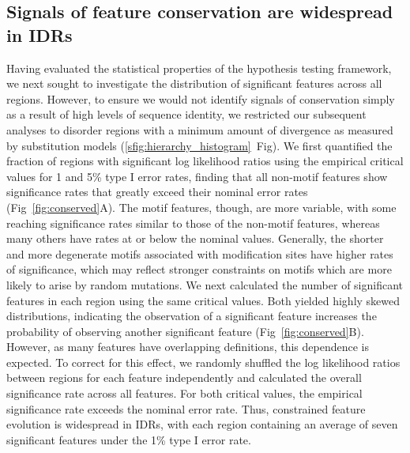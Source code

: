 \subsection{Signals of feature conservation are widespread in IDRs}
Having evaluated the statistical properties of the hypothesis testing framework, we next sought to investigate the distribution of significant features across all regions. However, to ensure we would not identify signals of conservation simply as a result of high levels of sequence identity, we restricted our subsequent analyses to disorder regions with a minimum amount of divergence as measured by substitution models (\ref{sfig:hierarchy_histogram}~Fig). We first quantified the fraction of regions with significant log likelihood ratios using the empirical critical values for 1 and 5\% type I error rates, finding that all non-motif features show significance rates that greatly exceed their nominal error rates (Fig~\ref{fig:conserved}A). The motif features, though, are more variable, with some reaching significance rates similar to those of the non-motif features, whereas many others have rates at or below the nominal values. Generally, the shorter and more degenerate motifs associated with modification sites have higher rates of significance, which may reflect stronger constraints on motifs which are more likely to arise by random mutations. We next calculated the number of significant features in each region using the same critical values. Both yielded highly skewed distributions, indicating the observation of a significant feature increases the probability of observing another significant feature (Fig~\ref{fig:conserved}B). However, as many features have overlapping definitions, this dependence is expected. To correct for this effect, we randomly shuffled the log likelihood ratios between regions for each feature independently and calculated the overall significance rate across all features. For both critical values, the empirical significance rate exceeds the nominal error rate. Thus, constrained feature evolution is widespread in IDRs, with each region containing an average of seven significant features under the 1\% type I error rate.

